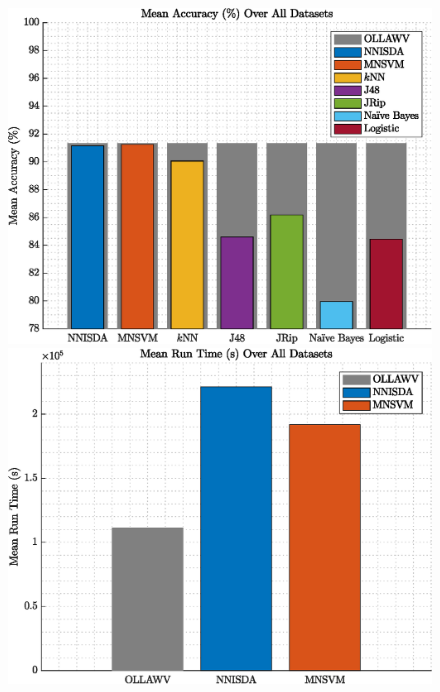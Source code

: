 \documentclass{article}
\begin{document}
\begin{figure}[t!]
\centering
\begin{minipage}{0.3\textwidth}
\includegraphics[width=\textwidth]{../../figures/mean_accuracy.eps}
\end{minipage}
\begin{minipage}{0.3\textwidth}
\includegraphics[width=\textwidth]{../../figures/mean_time.eps}
\end{minipage}
\begin{minipage}{0.3\textwidth}

\end{minipage}
\end{figure}
\end{document}
